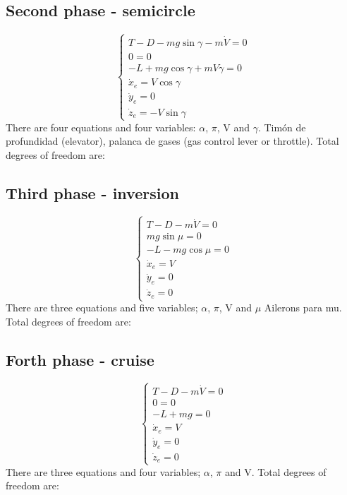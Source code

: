 \subsection*{Second phase - semicircle}
\begin{equation}
	\begin{cases}
		T - D -mg\sin\gamma-m\dot{V}=0\\
		0=0\\
		-L+mg\cos\gamma+mV\dot{\gamma}=0\\
		\dot{x}_e=V\cos\gamma\\
		\dot{y}_e=0\\
		\dot{z}_e=-V\sin\gamma
	\end{cases}
\label{eq:semicircle}
\end{equation}
There are four equations and four variables: $\alpha$, $\pi$, V and $\gamma$. Timón de profundidad (elevator), palanca de gases (gas control lever or throttle).
Total degrees of freedom are:


\subsection*{Third phase - inversion}
\begin{equation}
	\begin{cases}
		T - D -m\dot{V}=0\\
		mg\sin\mu=0\\
		-L-mg\cos\mu=0\\
		\dot{x}_e=V\\
		\dot{y}_e=0\\
		\dot{z}_e=0
	\end{cases}
\end{equation}
There are three equations and five variables; $\alpha$, $\pi$, V and $\mu$ Ailerons para mu.
Total degrees of freedom are:

\subsection*{Forth phase - cruise}
\begin{equation}
	\begin{cases}
		T - D -m\dot{V}=0\\
		0=0\\
		-L+mg=0\\
		\dot{x}_e=V\\
		\dot{y}_e=0\\
		\dot{z}_e=0
	\end{cases}
\end{equation}
There are three equations and four variables; $\alpha$, $\pi$ and V.
Total degrees of freedom are: